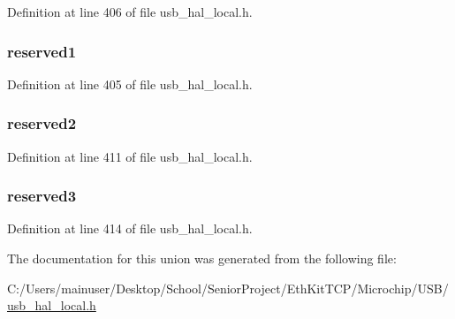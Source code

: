 Definition at line 406 of file usb\+\_\+hal\+\_\+local.\+h.

\hypertarget{union_t_r_a_n_s_f_e_r___i_d___f_l_a_g_s_abe161ac56af59685b709222f264666ba}{}
\subsubsection[{reserved1}]{ reserved1}\label{union_t_r_a_n_s_f_e_r___i_d___f_l_a_g_s_abe161ac56af59685b709222f264666ba}


Definition at line 405 of file usb\+\_\+hal\+\_\+local.\+h.

\hypertarget{union_t_r_a_n_s_f_e_r___i_d___f_l_a_g_s_af0ee3e33fad359064e98e75399c9da1f}{}
\subsubsection[{reserved2}]{ reserved2}\label{union_t_r_a_n_s_f_e_r___i_d___f_l_a_g_s_af0ee3e33fad359064e98e75399c9da1f}


Definition at line 411 of file usb\+\_\+hal\+\_\+local.\+h.

\hypertarget{union_t_r_a_n_s_f_e_r___i_d___f_l_a_g_s_a6f7d2ef29d8750233d2702f45ce01c9d}{}
\subsubsection[{reserved3}]{ reserved3}\label{union_t_r_a_n_s_f_e_r___i_d___f_l_a_g_s_a6f7d2ef29d8750233d2702f45ce01c9d}


Definition at line 414 of file usb\+\_\+hal\+\_\+local.\+h.



The documentation for this union was generated from the following file\+:\begin{DoxyCompactItemize}
\item 
C\+:/\+Users/mainuser/\+Desktop/\+School/\+Senior\+Project/\+Eth\+Kit\+T\+C\+P/\+Microchip/\+U\+S\+B/\hyperlink{usb__hal__local_8h}{usb\+\_\+hal\+\_\+local.\+h}\end{DoxyCompactItemize}
